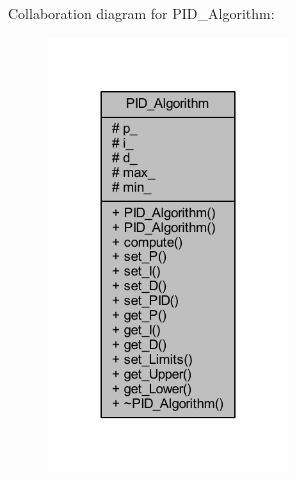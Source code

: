 Collaboration diagram for P\+I\+D\+\_\+\+Algorithm\+:
\nopagebreak
\begin{figure}[H]
\begin{center}
\leavevmode
\includegraphics[width=180pt]{class_p_i_d___algorithm__coll__graph}
\end{center}
\end{figure}
